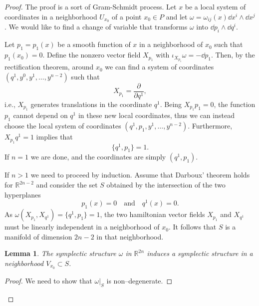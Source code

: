 \documentclass[english,fontsize=11pt,paper=b5]{scrbook}
\numberwithin{equation}{chapter}
\newtheorem{lemma}[theorem]{Lemma}
\theoremstyle{definition}
\begin{document}
    \begin{proof}
      The proof is a sort of Gram-Schmidt process.
      Let $x$ be a local system of coordinates in a neighborhood $U_{x_0}$ of a point $x_0\in P$ and let $\omega = \omega_{ij}(x)\dd x^i\wedge \dd x^j$.
      We would like to find a change of variable that transforms $\omega$ into $\dd p_i \wedge \dd q^i$.

      Let $p_1=p_1(x)$ be a smooth function of $x$ in a neighborhood of $x_0$ such that $p_1(x_0) = 0$.
      Define the nonzero vector field $X_{p_1}$ with $\iota_{X_{p_1}}\omega = -\dd p_1$.
      Then, by the rectification theorem, around $x_0$ we can find a system of coordinates $(q^1, y^0, y^1, \ldots, y^{n-2})$ such that
      \begin{equation}
        X_{p_1} = \frac{\partial}{\partial q^1},
      \end{equation}
      i.e., $X_{p_1}$ generates translations in the coordinate $q^1$.
      Being $X_{p_1} p_1 = 0$, the function $p_1$ cannot depend on $q^1$ in these new local coordinates, thus we can instead choose the local system of coordinates $(q^1, p_1, y^1, \ldots, y^{n-2})$.
      Furthermore, $X_{p_1} q^1 = 1$ implies that
      \begin{equation}
        \big\{q^1, p_1\big\} = 1.
      \end{equation}
      If $n=1$ we are done, and the coordinates are simply $(q^1, p_1)$.

      If $n>1$ we need to proceed by induction.
      Assume that Darboux' theorem holds for $\mathbb{R}^{2n-2}$ and consider the set $S$ obtained by the intersection of the two hyperplanes
      \begin{equation}
        p_1(x) = 0 \quad\mbox{and}\quad q^1(x) = 0.
      \end{equation}
      As $\omega(X_{p_1}, X_{q^1}) = \big\{q^1, p_1\big\} = 1$, the two hamiltonian vector fields $X_{p_1}$ and $X_{q^1}$ must be linearly independent in a neighborhood of $x_0$. It follows that $S$ is a manifold of dimension $2n-2$ in that neighborhood.

      \begin{lemma}
        The symplectic structure $\omega$ in $\mathbb{R}^{2n}$ induces a symplectic structure in a neighborhood $V_{x_0}\subset S$.
      \end{lemma}
      \begin{proof}
        We need to show that $\omega|_S$ is non--degenerate.


\end{proof}
\end{proof}
\end{document}
